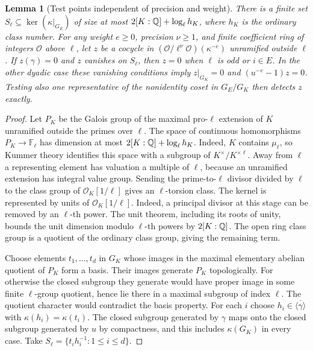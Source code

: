 \documentclass[a4paper,11pt]{article}
\newtheorem{lemma}[proposition]{Lemma}
\theoremstyle{definition}
\theoremstyle{remark}
\numberwithin{equation}{section}
\begin{document}
\begin{lemma}[Test points independent of precision and weight]
\leavevmode\label{lem:testpoints714}
There is a finite set \(S_\ell\subseteq\ker(\kappa|_{G_E})\)
of size at most \(2[K:\mathbb Q]+\log_\ell h_K\), where \(h_K\)
is the ordinary class number. For any weight \(e\ge0\),
precision \(\nu\ge1\), and finite coefficient ring of integers
\(\mathcal O\) above \(\ell\), let \(z\) be a cocycle in
\((\mathcal O/\ell^\nu\mathcal O)(\kappa^{-e})\) unramified
outside \(\ell\). If \(z(\gamma)=0\) and \(z\) vanishes on
\(S_\ell\), then \(z=0\) when \(\ell\) is odd or \(i\in E\).
In the other dyadic case these vanishing conditions imply
\(z|_{G_K}=0\) and \((u^{-e}-1)z=0\). Testing also one
representative of the nonidentity coset in \(G_E/G_K\)
then detects \(z\) exactly.
\end{lemma}
\begin{proof}
Let \(P_K\) be the Galois group of the maximal pro-\(\ell\)
extension of \(K\) unramified outside the primes over \(\ell\).
The space of continuous homomorphisms
\(P_K\to\mathbb F_\ell\) has dimension at most
\(2[K:\mathbb Q]+\log_\ell h_K\). Indeed, \(K\) contains
\(\mu_\ell\), so Kummer theory identifies this space with a
subgroup of \(K^\times/K^{\times\ell}\). Away from \(\ell\)
a representing element has valuation a multiple of \(\ell\),
because an unramified extension has integral value group.
Sending the prime-to-\(\ell\) divisor divided by \(\ell\)
to the class group of \(\mathcal O_K[1/\ell]\) gives an
\(\ell\)-torsion class. The kernel is represented by units
of \(\mathcal O_K[1/\ell]\). Indeed, a principal divisor
at this stage can be removed by an \(\ell\)-th power. The
unit theorem, including its roots of unity, bounds the unit
dimension modulo \(\ell\)-th powers by \(2[K:\mathbb Q]\). The
open ring class group is a quotient of the ordinary class
group, giving the remaining term.

Choose elements \(t_1,\ldots,t_d\) in \(G_K\) whose images
in the maximal elementary abelian quotient of \(P_K\) form
a basis. Their images generate \(P_K\) topologically. For
otherwise the closed subgroup they generate would have proper
image in some finite \(\ell\)-group quotient, hence lie there
in a maximal subgroup of index \(\ell\). The quotient
character would contradict the basis property. For each \(i\)
choose \(h_i\in\overline{\langle\gamma\rangle}\) with
\(\kappa(h_i)=\kappa(t_i)\). The closed subgroup generated by
\(\gamma\) maps onto the closed subgroup generated by \(u\)
by compactness, and this includes \(\kappa(G_K)\) in every
case. Take \(S_\ell=\{t_i h_i^{-1}:1\le i\le d\}\).


\end{proof}
\end{document}
